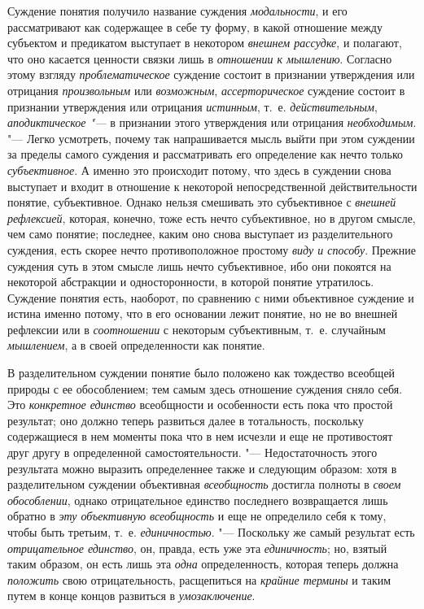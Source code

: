 {Суждение понятия получило название суждения
{\em модальности}, и его
рассматривают как содержащее в себе ту форму, в какой отношение между
субъектом и предикатом выступает в некотором
{\em внешнем рассудке}, и
полагают, что оно касается ценности связки лишь в
{\em отношении к мышлению}.
Согласно этому взгляду
{\em проблематическое}
суждение состоит в признании утверждения или отрицания
{\em произвольным} или
{\em возможным},
{\em ассерторическое}
суждение состоит в признании утверждения или отрицания
{\em истинным}, т.~е.
{\em действительным},
{\em аподиктическое "--- }в
признании этого утверждения или отрицания
{\em необходимым}. "---
Легко усмотреть, почему так напрашивается мысль выйти при
этом суждении за пределы самого суждения и рассматривать его определение
как нечто только {\em субъективное}.
А именно это происходит потому, что здесь в суждении снова
выступает и входит в отношение к некоторой непосредственной
действительности понятие, субъективное. Однако нельзя смешивать это
субъективное с {\em внешней
рефлексией}, которая, конечно, тоже есть нечто субъективное,
но в другом смысле, чем само понятие; последнее, каким оно снова выступает
из разделительного суждения, есть скорее нечто противоположное простому
{\em виду и способу}.
Прежние суждения суть в этом смысле лишь нечто субъективное,
ибо они покоятся на некоторой абстракции и односторонности, в которой
понятие утратилось. Суждение понятия есть, наоборот, по сравнению с ними
объективное суждение и истина именно потому, что в его основании лежит
понятие, но не во внешней рефлексии или в
{\em соотношении} с
некоторым субъективным, т.~е. случайным
{\em мышлением}, а в
своей определенности как понятие.

В разделительном суждении понятие было положено как тождество
всеобщей природы с ее обособлением; тем самым здесь отношение суждения
сняло себя. Это {\em конкретное
единство} всеобщности и особенности есть пока что простой
результат; оно должно теперь развиться далее в тотальность, поскольку
содержащиеся в нем моменты пока что в нем исчезли и еще не противостоят
друг другу в определенной самостоятельности. "---
Недостаточность этого результата можно выразить определеннее
также и следующим образом: хотя в разделительном суждении объективная
{\em всеобщность}
достигла полноты в
{\em своем обособлении},
однако отрицательное единство последнего возвращается лишь
обратно в {\em эту объективную
всеобщность} и еще не определило себя к тому, чтобы быть
третьим, т.~е. {\em единичностью}. "---
Поскольку же самый результат есть
{\em отрицательное единство},
он, правда, есть уже эта
{\em единичность}; но,
взятый таким образом, он есть лишь эта
{\em одна}
определенность, которая теперь должна
{\em положить} свою
отрицательность, расщепиться на
{\em крайние термины} и
таким путем в конце концов развиться в
{\em умозаключение}.

}
